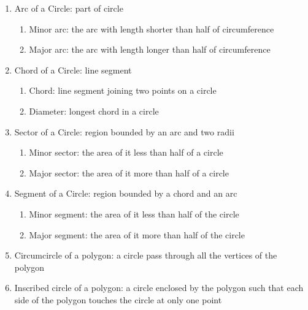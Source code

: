 
\begin{mysubsection}{}
    \begin{enumerate}
        \item Arc of a Circle: part of circle
            \begin{enumerate}
                \item Minor arc: the arc with length shorter than half of circumference
                \item Major arc: the arc with length longer than half of circumference
            \end{enumerate}
        \item Chord of a Circle: line segment
            \begin{enumerate}
                \item Chord: line segment joining two points on a circle
                \item Diameter: longest chord in a circle
            \end{enumerate}
        \item Sector of a Circle: region bounded by an arc and two radii
            \begin{enumerate}
                \item Minor sector: the area of it less than half of a circle
                \item Major sector: the area of it more than half of a circle
            \end{enumerate}
        \item Segment of a Circle: region bounded by a chord and an arc
            \begin{enumerate}
                \item Minor segment: the area of it less than half of the circle
                \item Major segment: the area of it more than half of the circle
            \end{enumerate}
        \item Circumcircle of a polygon: a circle pass through all the vertices of the polygon
        \item Inscribed circle of a polygon: a circle enclosed by the polygon such that each side of the polygon touches the circle at only one point
    \end{enumerate}
\end{mysubsection}
